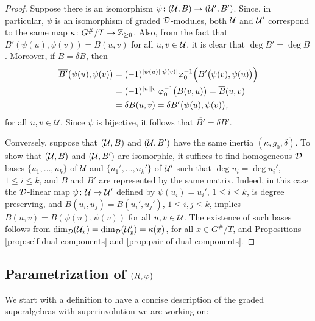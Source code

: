 \begin{proof}
	Suppose there is an isomorphism $\psi\colon (\mathcal U, B) \to (\mathcal U', B')$.
	Since, in particular, $\psi$ is an isomorphism of graded $\mathcal{D}$-modules, both $\mathcal U$ and $\mathcal U'$ correspond to the same map $\kappa\colon G^\#/T \to \mathbb{Z}_{\geq 0}$.
	Also, from the fact that $B'(\psi(u), \psi(v)) = B(u, v)$ for all $u, v\in \mathcal U$, it is clear that $\deg B' = \deg B$.
	Moreover, if $\overline{B} = \delta B$, then
	\begin{align*}
		\overline{B'} \big(\psi(u), \psi(v) \big) & = (-1)^{|\psi(u)||\psi(v)|} \varphi_0^{-1} \Big( B'\big( \psi(v) , \psi(u) \big) \Big) \\
		                                          & = (-1)^{|u||v|} \varphi_0^{-1} \big( B(v, u) \big)
		= \overline{B} (u, v)                                                                                                         \\
		                                          & = \delta B(u, v) = \delta B' \big( \psi(u), \psi(v) \big),
	\end{align*}
	for all $u, v \in \mathcal U$.
	Since $\psi$ is bijective, it follows that $\overline{B'} = \delta B'$.

	Conversely, suppose that $(\mathcal U, B)$ and $(\mathcal U, B')$ have the same inertia $(\kappa, g_0, \delta)$.
	To show that $(\mathcal U, B)$ and $(\mathcal U, B')$ are isomorphic, it suffices to find homogeneous $\mathcal{D}$-bases $\{u_1, \ldots, u_k\}$ of $\mathcal U$ and $\{u_1', \ldots, u_k'\}$ of $\mathcal U'$ such that $\deg u_i = \deg u_i'$, $1 \leq i \leq k$, and $B$ and $B'$ are represented by the same matrix.
	Indeed, in this case the $\mathcal{D}$-linear map $\psi\colon \mathcal U \to \mathcal U'$ defined by $\psi(u_i) = u_i'$, $1 \leq i \leq k$, is degree preserving, and $B(u_i, u_j) = B(u_i', u_j')$, $1 \leq i,j \leq k$, implies $B(u, v) = B( \psi(u), \psi(v) )$ for all $u, v\in \mathcal U$.
	The existence of such bases follows from $\dim_{\mathcal{D}} (\mathcal U_x) = \dim_{\mathcal{D}} (\mathcal U_x') = \kappa(x)$, for all $x \in G^\#/T$, and Propositions \ref{prop:self-dual-components} and \ref{prop:pair-of-dual-components}.
\end{proof}

\subsection{Parametrization of \texorpdfstring{$(R, \varphi)$}{(R, phi)}}

We start with a definition to have a concise description of the graded superalgebras with superinvolution we are working on:

